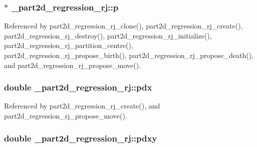 \subsubsection[{\texorpdfstring{p}{p}}]{$\ast$ \+\_\+part2d\+\_\+regression\+\_\+rj\+::p}\hypertarget{struct__part2d__regression__rj_a97029ced96e99e43cefeed0cc6706063}{}\label{struct__part2d__regression__rj_a97029ced96e99e43cefeed0cc6706063}


Referenced by part2d\+\_\+regression\+\_\+rj\+\_\+clone(), part2d\+\_\+regression\+\_\+rj\+\_\+create(), part2d\+\_\+regression\+\_\+rj\+\_\+destroy(), part2d\+\_\+regression\+\_\+rj\+\_\+initialize(), part2d\+\_\+regression\+\_\+rj\+\_\+partition\+\_\+centre(), part2d\+\_\+regression\+\_\+rj\+\_\+propose\+\_\+birth(), part2d\+\_\+regression\+\_\+rj\+\_\+propose\+\_\+death(), and part2d\+\_\+regression\+\_\+rj\+\_\+propose\+\_\+move().

\subsubsection[{\texorpdfstring{pdx}{pdx}}]{\setlength{\rightskip}{0pt plus 5cm}double \+\_\+part2d\+\_\+regression\+\_\+rj\+::pdx}\hypertarget{struct__part2d__regression__rj_a275de1ec4f9dcc612f18d4301a25c5ba}{}\label{struct__part2d__regression__rj_a275de1ec4f9dcc612f18d4301a25c5ba}


Referenced by part2d\+\_\+regression\+\_\+rj\+\_\+create(), and part2d\+\_\+regression\+\_\+rj\+\_\+propose\+\_\+move().

\subsubsection[{\texorpdfstring{pdxy}{pdxy}}]{\setlength{\rightskip}{0pt plus 5cm}double \+\_\+part2d\+\_\+regression\+\_\+rj\+::pdxy}\hypertarget{struct__part2d__regression__rj_a4847fa9810f91bf131437ce0b0b2aa2e}{}\label{struct__part2d__regression__rj_a4847fa9810f91bf131437ce0b0b2aa2e}


